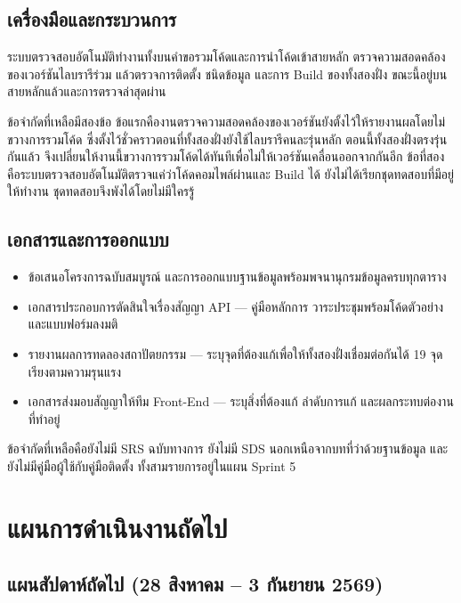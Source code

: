 \subsection{เครื่องมือและกระบวนการ}

ระบบตรวจสอบอัตโนมัติทำงานทั้งบนคำขอรวมโค้ดและการนำโค้ดเข้าสายหลัก ตรวจความสอดคล้องของเวอร์ชันไลบรารีร่วม แล้วตรวจการติดตั้ง ชนิดข้อมูล และการ Build ของทั้งสองฝั่ง ขณะนี้อยู่บนสายหลักแล้วและการตรวจล่าสุดผ่าน

ข้อจำกัดที่เหลือมีสองข้อ ข้อแรกคืองานตรวจความสอดคล้องของเวอร์ชันยังตั้งไว้ให้รายงานผลโดยไม่ขวางการรวมโค้ด ซึ่งตั้งไว้ชั่วคราวตอนที่ทั้งสองฝั่งยังใช้ไลบรารีคนละรุ่นหลัก ตอนนี้ทั้งสองฝั่งตรงรุ่นกันแล้ว จึงเปลี่ยนให้งานนี้ขวางการรวมโค้ดได้ทันทีเพื่อไม่ให้เวอร์ชันเคลื่อนออกจากกันอีก ข้อที่สองคือระบบตรวจสอบอัตโนมัติตรวจแค่ว่าโค้ดคอมไพล์ผ่านและ Build ได้ ยังไม่ได้เรียกชุดทดสอบที่มีอยู่ให้ทำงาน ชุดทดสอบจึงพังได้โดยไม่มีใครรู้

\subsection{เอกสารและการออกแบบ}

\begin{itemize}
  \item ข้อเสนอโครงการฉบับสมบูรณ์ และการออกแบบฐานข้อมูลพร้อมพจนานุกรมข้อมูลครบทุกตาราง
  \item เอกสารประกอบการตัดสินใจเรื่องสัญญา API — คู่มือหลักการ วาระประชุมพร้อมโค้ดตัวอย่าง และแบบฟอร์มลงมติ
  \item รายงานผลการทดลองสถาปัตยกรรม — ระบุจุดที่ต้องแก้เพื่อให้ทั้งสองฝั่งเชื่อมต่อกันได้ 19 จุด เรียงตามความรุนแรง
  \item เอกสารส่งมอบสัญญาให้ทีม Front-End — ระบุสิ่งที่ต้องแก้ ลำดับการแก้ และผลกระทบต่องานที่ทำอยู่
\end{itemize}

ข้อจำกัดที่เหลือคือยังไม่มี SRS ฉบับทางการ ยังไม่มี SDS นอกเหนือจากบทที่ว่าด้วยฐานข้อมูล และยังไม่มีคู่มือผู้ใช้กับคู่มือติดตั้ง ทั้งสามรายการอยู่ในแผน Sprint 5

\section{แผนการดำเนินงานถัดไป}
\label{sec:next}

\subsection{แผนสัปดาห์ถัดไป (28 สิงหาคม – 3 กันยายน 2569)}

